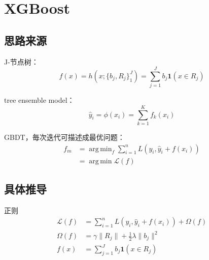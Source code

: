 
\section{XGBoost}
\subsection{思路来源}
\begin{frame}
    J-节点树：
    \begin{equation*}
        f(x) = h \left (x; \{b_j, R_j\}^J_1 \right ) = \displaystyle \sum_{j=1}^J b_j \mathbf{1}(x \in R_j)
    \end{equation*}

    tree ensemble model：
    \begin{equation*}
        \hat{y}_i = \phi(x_i) = \displaystyle \sum_{k=1}^K f_k(x_i)
    \end{equation*}

    GBDT，毎次迭代可描述成最优问题：
    \begin{align*}
        f_m &= \operatorname{arg \, min}_f \sum_{i=1}^n L \left ( y_i, \hat{y}_i + f(x_i) \right ) \\
            &= \operatorname{arg \, min} \mathcal{L}(f)
    \end{align*}
\end{frame}


\subsection{具体推导}
\begin{frame}{正则}
    \begin{align*}
        \mathcal{L}(f) &= \displaystyle \sum_{i=1}^{n} L(y_i, \hat{y}_i + f(x_i)) + \Omega(f) \\[2ex]
        \Omega(f) &= \gamma \|R_j\| + \frac{1}{2} \lambda \|b_j\|^2 \\
        f(x) &= \sum_{j=1}^J b_j \mathbf{1}(x \in R_j)
    \end{align*}
\end{frame}

